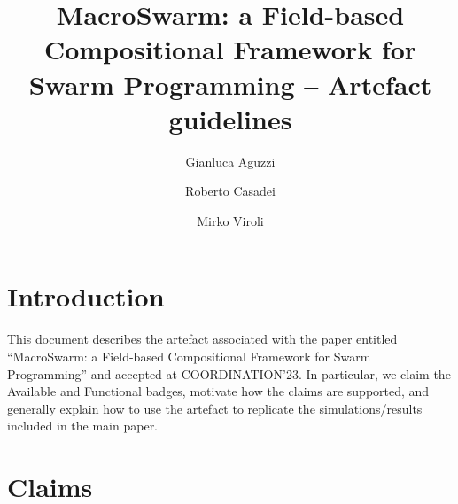 \documentclass[runningheads]{llncs}
\newcommand{\MacroSwarm}{{\sc{}MacroSwarm}}
\begin{document}
%
\title{\MacroSwarm{}: a Field-based Compositional Framework for Swarm Programming -- Artefact guidelines}

\newcommand{\meta}[1]{{\color{blue} #1}}%
%
\author{Gianluca Aguzzi%
 \and
Roberto Casadei%
 \and
Mirko Viroli%
}
%
%
%
\maketitle              %
%
%
\section{Introduction}

This document describes the artefact associated with the paper entitled ``\MacroSwarm{}: a Field-based Compositional Framework for Swarm Programming'' and accepted at COORDINATION'23.
%
In particular,
 we claim the Available and Functional badges,
 motivate how the claims are supported,
 and generally
 explain how to use the artefact
 to replicate the simulations/results
 included in the main paper.

\section{Claims}


\end{document}
